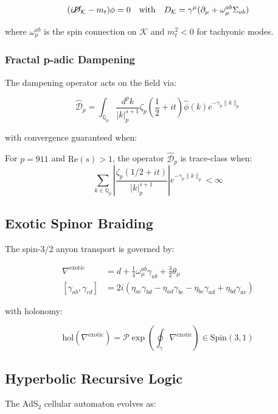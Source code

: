 \documentclass[12pt]{article}
\begin{document}
\begin{equation}
(i\cancel{D}_{\mathcal{K}} - m_t)\phi = 0 \quad \text{with} \quad D_{\mathcal{K}} = \gamma^\mu(\partial_\mu + \omega_\mu^{ab}\Sigma_{ab})
\end{equation}

where $\omega_\mu^{ab}$ is the spin connection on $\mathcal{K}$ and $m_t^2 < 0$ for tachyonic modes.

\subsubsection{Fractal p-adic Dampening}
The dampening operator acts on the field via:

\begin{equation}
\hat{\mathcal{D}}_p = \int_{\mathbb{Q}_p} \frac{d^p k}{|k|_p^{s+1}} \zeta_p\left(\frac{1}{2} + it\right) \hat{\phi}(k)e^{-\gamma_p\|k\|_p}
\end{equation}

with convergence guaranteed when:

\begin{theorem}
For $p=911$ and $\text{Re}(s) > 1$, the operator $\hat{\mathcal{D}}_p$ is trace-class when:
\begin{equation}
\sum_{k\in\mathbb{Q}_p} \left|\frac{\zeta_p(1/2 + it)}{|k|_p^{s+1}}\right| e^{-\gamma_p\|k\|_p} < \infty
\end{equation}
\end{theorem}

\subsection{Exotic Spinor Braiding}
The spin-3/2 anyon transport is governed by:

\begin{align}
\nabla^{\text{exotic}} &= d + \frac{1}{4}\omega_\mu^{ab}\gamma_{ab} + \frac{3}{2}\theta_\mu \nonumber \\
[\gamma_{ab}, \gamma_{cd}] &= 2i(\eta_{ac}\gamma_{bd} - \eta_{ad}\gamma_{bc} - \eta_{bc}\gamma_{ad} + \eta_{bd}\gamma_{ac})
\end{align}

with holonomy:

\begin{equation}
\text{hol}(\nabla^{\text{exotic}}) = \mathcal{P}\exp\left(\oint_\gamma \nabla^{\text{exotic}}\right) \in \text{Spin}(3,1)
\end{equation}

\subsection{Hyperbolic Recursive Logic}
The AdS$_2$ cellular automaton evolves as:
\end{document}
